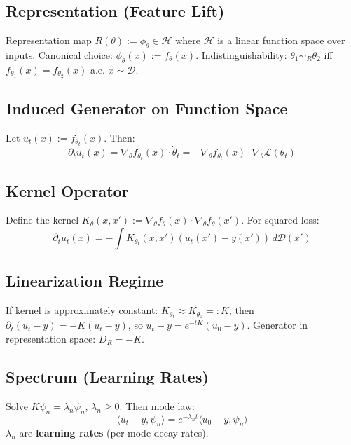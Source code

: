 \documentclass[12pt, oneside]{article}
\begin{document}
\subsection{Representation (Feature Lift)}

Representation map $R(\theta) := \phi_\theta \in \mathcal{H}$ where $\mathcal{H}$ is a linear function space over inputs. Canonical choice: $\phi_\theta(x) := f_\theta(x)$. Indistinguishability: $\theta_1 \sim_R \theta_2$ iff $f_{\theta_1}(x) = f_{\theta_2}(x)$ a.e. $x \sim \mathcal{D}$.

\subsection{Induced Generator on Function Space}

Let $u_t(x) := f_{\theta_t}(x)$. Then:
\begin{equation}
\partial_t u_t(x) = \nabla_\theta f_{\theta_t}(x) \cdot \dot{\theta}_t = -\nabla_\theta f_{\theta_t}(x) \cdot \nabla_\theta \mathcal{L}(\theta_t)
\end{equation}

\subsection{Kernel Operator}

Define the kernel $K_\theta(x,x') := \nabla_\theta f_\theta(x) \cdot \nabla_\theta f_\theta(x')$. For squared loss:
\begin{equation}
\partial_t u_t(x) = -\int K_{\theta_t}(x,x') (u_t(x') - y(x')) \, d\mathcal{D}(x')
\end{equation}

\subsection{Linearization Regime}

If kernel is approximately constant: $K_{\theta_t} \approx K_{\theta_0} =: K$, then $\partial_t (u_t - y) = -K(u_t - y)$, so $u_t - y = e^{-tK}(u_0 - y)$. Generator in representation space: $D_R = -K$.

\subsection{Spectrum (Learning Rates)}

Solve $K \psi_n = \lambda_n \psi_n$, $\lambda_n \geq 0$. Then mode law:
\begin{equation}
\langle u_t - y, \psi_n \rangle = e^{-\lambda_n t} \langle u_0 - y, \psi_n \rangle
\end{equation}
$\lambda_n$ are \textbf{learning rates} (per-mode decay rates).
\end{document}
